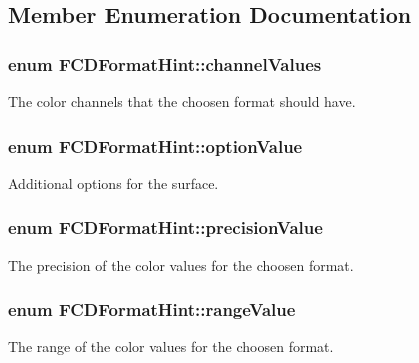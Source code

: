 \subsection{Member Enumeration Documentation}
\hypertarget{structFCDFormatHint_a4c22503ef75be12aa19a582b88ce32c1}{
\subsubsection[{channelValues}]{\setlength{\rightskip}{0pt plus 5cm}enum {\bf FCDFormatHint::channelValues}}}
\label{structFCDFormatHint_a4c22503ef75be12aa19a582b88ce32c1}
The color channels that the choosen format should have. \hypertarget{structFCDFormatHint_a4777b8826090e9f6c9812711faf3ac66}{
\subsubsection[{optionValue}]{\setlength{\rightskip}{0pt plus 5cm}enum {\bf FCDFormatHint::optionValue}}}
\label{structFCDFormatHint_a4777b8826090e9f6c9812711faf3ac66}
Additional options for the surface. \hypertarget{structFCDFormatHint_a720a2fffc66e38ba997c263e22ddc2c2}{
\subsubsection[{precisionValue}]{\setlength{\rightskip}{0pt plus 5cm}enum {\bf FCDFormatHint::precisionValue}}}
\label{structFCDFormatHint_a720a2fffc66e38ba997c263e22ddc2c2}
The precision of the color values for the choosen format. \hypertarget{structFCDFormatHint_a28f1ee9691301b71d657b472689d77a9}{
\subsubsection[{rangeValue}]{\setlength{\rightskip}{0pt plus 5cm}enum {\bf FCDFormatHint::rangeValue}}}
\label{structFCDFormatHint_a28f1ee9691301b71d657b472689d77a9}
The range of the color values for the choosen format. 

